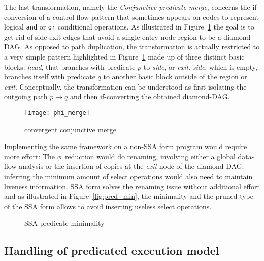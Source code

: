 The last transformation, namely the \emph{Conjunctive predicate merge}, concerns the if-conversion of a control-flow pattern that sometimes appears on codes to represent logical \texttt{and} or \texttt{or} conditional operations. 
As illustrated in Figure~\ref{fig:phi_merge} the goal is to get rid of side exit edges that avoid a single-entry-node region to be a diamond-DAG. 
As opposed to path duplication, the transformation is actually restricted to a very simple pattern highlighted in Figure~\ref{fig:phi_merge} made up of three distinct basic blocks: \textit{head}, that branches with predicate $p$ to \textit{side}, or \textit{exit}. 
\textit{side}, which is empty, branches itself with predicate $q$ to another basic block outside of the region or \textit{exit}. 
Conceptually, the transformation can be understood as first isolating the outgoing path $p\rightarrow q$ and then if-converting the obtained diamond-DAG.

\begin{figure}[h]
  \texttt{[image: phi\_merge]}
  \caption{\label{fig:phi_merge}convergent conjunctive merge} 
\end{figure}

Implementing the same framework on a non-SSA form program would require more effort: 
The $\phi$~reduction would do renaming, involving either a global data-flow analysis or the insertion of copies at the \textit{exit} node of the diamond-DAG; 
inferring the minimum amount of {select} operations would also need to maintain liveness information. 
SSA form solves the renaming issue without additional effort and as illustrated in Figure~\ref{fig:pred_min}, the minimality and the pruned type of the SSA form allows to avoid inserting useless {select} operations.

\begin{figure}[h]
\centering
  \hfill
\caption{\label{fig:pred_min} SSA predicate minimality}
\label{fig:minimality}
\end{figure}

\subsection{Handling of predicated execution model}

